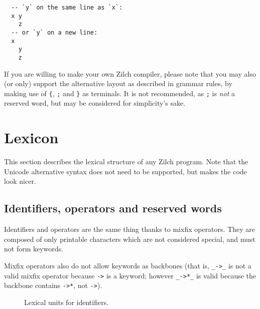 \noindent\begin{verbatim}
  -- `y` on the same line as `x`:
  x y
    z
  -- or `y` on a new line:
  x
    y
    z
\end{verbatim}
\vspace*{\baselineskip}

If you are willing to make your own Zilch compiler, please note that you may also (or only) support the alternative layout as described in grammar rules, by making use of \verb|{|, \verb|;| and \verb|}| as terminals.
It is not recommended, as \verb|;| is \textit{not} a reserved word, but may be considered for simplicity's sake.

\section{Lexicon}\label{sec:zilch-grammar-lexical}

This section describes the lexical structure of any Zilch program.
Note that the Unicode alternative syntax does not need to be supported, but makes the code look nicer.

\subsection{Identifiers, operators and reserved words}\label{subsec:zilch-grammar-lexical-identifiers}

Identifiers and operators are the same thing thanks to mixfix operators.
They are composed of only printable characters which are not considered special, and must not form keywords.

Mixfix operators also do not allow keywords as backbones (that is, \texttt{\_->\_} is not a valid mixfix operator because \texttt{->} is a keyword; however \texttt{\_->*\_} is valid because the backbone contains \texttt{->*}, not \texttt{->}).

\begin{figure}[H]
  \centering


  \caption{Lexical units for identifiers.}
  \label{fig:zilch-grammar-lexical-identifiers-grammar}
\end{figure}

